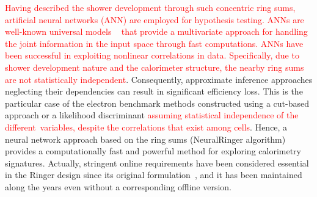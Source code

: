


\textcolor{red}{Having described the shower development through such concentric ring sums,  artificial neural networks (ANN) are employed for hypothesis testing.  ANNs are well-known universal models ~\cite{haykin_2008} that provide a multivariate approach for handling the joint information in the input space through fast computations.  ANNs have been successful in exploiting nonlinear correlations in data. Specifically, due to shower development nature and the calorimeter structure, the nearby ring sums are not statistically independent}. Consequently, approximate inference approaches neglecting their dependencies can result in significant efficiency loss. This is the particular case of the electron benchmark methods constructed using a cut-based approach or a likelihood discriminant \textcolor{red}{assuming statistical independence of the different variables, despite the correlations that exist among cells}.  Hence, a neural network approach based on the ring sums (NeuralRinger algorithm) provides a computationally fast and powerful method for exploring calorimetry signatures. Actually, stringent online requirements have been considered essential in the Ringer design since its original formulation~\cite{1995_seixas_ringer}, and it has been maintained along the years even without a corresponding offline version.



